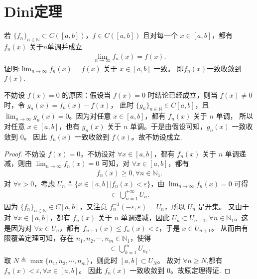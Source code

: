 \documentclass[../../main.tex]{subfiles}%
\begin{document}
\section{Dini定理}

\begin{theorem}[Dini定理]\label{theorem:Dini定理(数分版本)}
若 \(\{f_n\}_{n\in\mathbb{N}}\subset C([a,b])\)，\(f\in C([a,b])\) 且对每一个 \(x\in [a,b]\)，都有 \(f_n(x)\) 关于$n$单调并成立
\begin{align*}
\lim_{n\rightarrow\infty}f_n(x)=f(x).
\end{align*}
证明:\(\lim_{n\rightarrow\infty}f_n(x)=f(x)\) 关于 \(x\in [a,b]\) 一致。 即$f_n(x)$一致收敛到$f(x).$
\end{theorem}
\begin{remark}
不妨设 \(f(x) = 0\) 的原因：假设当 \(f(x) = 0\) 时结论已经成立，则当 \(f(x)\ne 0\) 时，令 \(g_n(x)=f_n(x)-f(x)\)，
此时 \(\{g_n\}_{n\in \mathbb{N}}\in C[a,b]\)，且 \(\lim_{n\rightarrow \infty}g_n(x)=0\)。因为对任意 \(x\in [a,b]\)，都有 \(f_n(x)\) 关于 \(n\) 单调，
所以对任意 \(x\in [a,b]\)，也有 \(g_n(x)\) 关于 \(n\) 单调。于是由假设可知，\(g_n(x)\) 一致收敛到 \(0\)。
因此 \(f_n(x)\) 一致收敛到 \(f(x)\)。故不妨设成立.
\end{remark}
\begin{proof}
不妨设 \(f(x) = 0\)，不妨设对 \(\forall x\in [a,b]\)，都有 \(f_n(x)\) 关于 \(n\) 单调递减，则由 \(\lim_{n\rightarrow \infty}f_n(x)=0\) 可知，对 \(\forall x\in [a,b]\)，都有
\begin{align*}
f_n(x)\geqslant 0,\forall n\in \mathbb{N}_1.
\end{align*}
对 \(\forall \varepsilon>0\)，考虑 \(U_n\triangleq \{x\in [a,b]|f_n(x)<\varepsilon\}\)，由 \(\lim_{n\rightarrow \infty}f_n(x)=0\) 可得
\begin{align*}
[a,b]\subset \bigcup_{n = 1}^{+\infty}U_n.
\end{align*}
因为 \(\{f_n\}_{n\in \mathbb{N}}\in C[a,b]\)，又注意 \(f_{n}^{-1}(-\varepsilon,\varepsilon)=U_n\)，所以 \(U_n\) 是开集。
又由于对 \(\forall x\in [a,b]\)，都有 \(f_n(x)\) 关于 \(n\) 单调递减，因此 \(U_n\subset U_{n + 1},\forall n\in \mathbb{N}_1\)。这是因为对 \(\forall x\in U_n\)，都有 \(f_{n + 1}(x)\leqslant f_n(x)<\varepsilon\)，于是 \(x\in U_{n + 1}\)。
从而由有限覆盖定理可知，存在 \(n_1,n_2,\cdots,n_m\in \mathbb{N}_1\)，使得
\begin{align*}
[a,b]\subset \bigcup_{k = 1}^mU_{n_k}.
\end{align*}
取 \(N\triangleq \max\{n_1,n_2,\cdots,n_m\}\)，则此时 \([a,b]\subset U_N\)。
故对 \(\forall n\geqslant N\),都有 \(f_n(x)<\varepsilon,\forall x\in [a,b]\)。
因此 \(f_n(x)\) 一致收敛到 $0$。故原定理得证. 
\end{proof}
\end{document}
